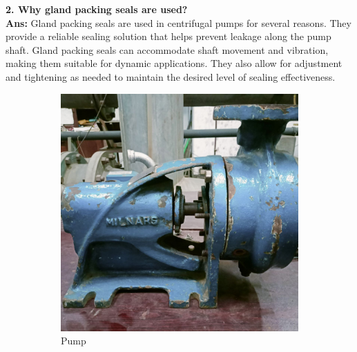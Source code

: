 \documentclass[12pt]{article}
\begin{document}
\vspace*{0.3cm}\hspace*{-0.035\linewidth}
\textbf{2. Why gland packing seals are used?}\\
\textbf{Ans:} Gland packing seals are used in centrifugal pumps for several reasons. They provide a reliable sealing solution that helps prevent leakage along the pump shaft. Gland packing seals can accommodate shaft movement and vibration, making them suitable for dynamic applications. They also allow for adjustment and tightening as needed to maintain the desired level of sealing effectiveness.

\pagebreak

\begin{figure}
  \centering

  \begin{subfigure}{0.3\textwidth}
      \includegraphics[width=\linewidth]{img/p_01.jpg}
      \caption{Pump}  
  \end{subfigure}
  \hfill
  \begin{subfigure}{0.3\textwidth}

\end{subfigure}
\end{figure}
\end{document}
